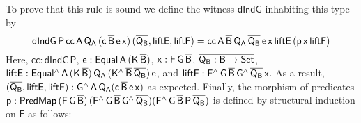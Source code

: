 \documentclass[9pt]{entcs}
\begin{document}
To prove that this rule is sound we define the witness
$\mathsf{dIndG}$ inhabiting this type by
\[\mathsf{dIndG\,P\,cc\,A\,Q_A\,(c\,\overline{B}\,e\,x)\,(\overline{Q_B}, liftE, liftF)
= cc\,A\,\overline{B}\,Q_A\,\overline{Q_B}\,e\,x\,liftE\,(p\,x\,liftF)}\] Here,
$\mathsf{cc : dIndC\,P}$, $\mathsf{e : Equal\,A\,(K\,\overline{B})}$,
$\mathsf{x : F\,G\,\overline{B}}$, $\overline{\mathsf{Q_B : B \to Set}}$,
$\mathsf{liftE : Equal^{\wedge}\,A\,(K\,\overline{B})\,Q_A\,
  (K^{\wedge}\,\overline{B}\,\overline{Q_B})\,e}$, and $\mathsf{liftF :
  F^{\wedge}\,G\,\overline{B}\,G^{\wedge}\,{\overline{Q_B}}\,x}$. As a result,
$\mathsf{(\overline{Q_B}, liftE, liftF) : G^{\wedge}\,A\,Q_A
  (c\,\overline{B}\,e\,x)}$ as expected. 
Finally, the morphism of predicates
$\mathsf{p :
  PredMap\,(F\,G\,\overline{B})\,(F^{\wedge}\,G\,\overline{B}\,G^{\wedge}\,\overline{Q_B})
  (F^{\wedge}\,G\,\overline{B}\,P\,\overline{Q_B})}$ 
is defined by structural induction on $\mathsf{F}$ as follows:
\end{document}
